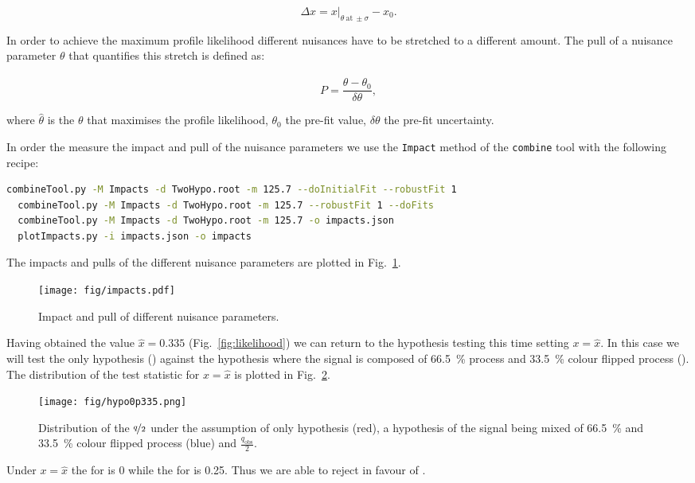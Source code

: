 \begin{equation}
  \Delta x = x\bigg\rvert_{\theta\ \text{at}\ \pm\sigma}-x_{0}.
\end{equation} 

In order to achieve the maximum profile likelihood different nuisances have to be stretched to a different amount. The pull of a nuisance parameter $\theta$ that quantifies this stretch is defined as:

\begin{equation}
  P = \frac{\hat{\theta}-\theta_{0}}{\delta\theta},
\end{equation} 

\noindent where $\hat{\theta}$ is the $\theta$ that maximises the profile likelihood, $\theta_{0}$ \textendash the pre-fit value, $\delta\theta$ \textendash the pre-fit uncertainty.

In order the measure the impact and pull of the nuisance parameters we use the \lstinline[language=sh]|Impact| method of the \lstinline[language=sh]|combine| tool with the following recipe:

\begin{lstlisting}[language=sh, breaklines=true]
  combineTool.py -M Impacts -d TwoHypo.root -m 125.7 --doInitialFit --robustFit 1
  combineTool.py -M Impacts -d TwoHypo.root -m 125.7 --robustFit 1 --doFits
  combineTool.py -M Impacts -d TwoHypo.root -m 125.7 -o impacts.json
  plotImpacts.py -i impacts.json -o impacts
\end{lstlisting}

The impacts and pulls of the different nuisance parameters are plotted in Fig.~\ref{fig:impacts}.

\begin{figure}
  \centering
  \texttt{[image: fig/impacts.pdf]}
  \caption{Impact and pull of different nuisance parameters.}
  \label{fig:impacts}
\end{figure}

Having obtained the value $\hat{x}=0.335$ (Fig.~\ref{fig:likelihood}) we can return to the hypothesis testing this time setting $x=\hat{x}$. In this case we will test the \ttbar only hypothesis (\Hnull) against the hypothesis where the signal is composed of 66.5~\% \ttbar process and 33.5~\% colour flipped \ttbar process (\Halt). The distribution of the test statistic for $x=\hat{x}$ is plotted in Fig.~\ref{fig:hypo0p335}.

\begin{figure}
  \centering
  \texttt{[image: fig/hypo0p335.png]}
  \caption{Distribution of the $\nicefrac{q}{2}$ under the assumption of \ttbar only hypothesis (red), a hypothesis of the signal being mixed of 66.5~\% \ttbar and 33.5~\% colour flipped \ttbar process (blue) and $\frac{q_{\text{obs}}}{2}$.}
  \label{fig:hypo0p335}
\end{figure}

Under $x=\hat{x}$ the \pval for \Hnull is 0 while the \pval for \Halt is 0.25. Thus we are able to reject \Hnull in favour of \Halt.
